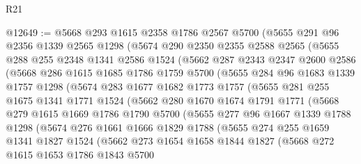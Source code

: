 \begin{lexlean}{R21}
\begin{coremodule}
@12649 := @5668
    @293
    @1615
    @2358
    @1786
    @2567
    @5700
    (@5655
      @291
      @96
      @2356
      @1339
      @2565
      @1298
      (@5674
        @290
        @2350
        @2355
        @2588
        @2565
        (@5655
          @288
          @255
          @2348
          @1341
          @2586
          @1524
          (@5662
            @287
            @2343
            @2347
            @2600
            @2586
            (@5668
              @286
              @1615
              @1685
              @1786
              @1759
              @5700
              (@5655
                @284
                @96
                @1683
                @1339
                @1757
                @1298
                (@5674
                  @283
                  @1677
                  @1682
                  @1773
                  @1757
                  (@5655
                    @281
                    @255
                    @1675
                    @1341
                    @1771
                    @1524
                    (@5662
                      @280
                      @1670
                      @1674
                      @1791
                      @1771
                      (@5668
                        @279
                        @1615
                        @1669
                        @1786
                        @1790
                        @5700
                        (@5655
                          @277
                          @96
                          @1667
                          @1339
                          @1788
                          @1298
                          (@5674
                            @276
                            @1661
                            @1666
                            @1829
                            @1788
                            (@5655
                              @274
                              @255
                              @1659
                              @1341
                              @1827
                              @1524
                              (@5662
                                @273
                                @1654
                                @1658
                                @1844
                                @1827
                                (@5668
                                  @272
                                  @1615
                                  @1653
                                  @1786
                                  @1843
                                  @5700

\end{coremodule}
\end{lexlean}
